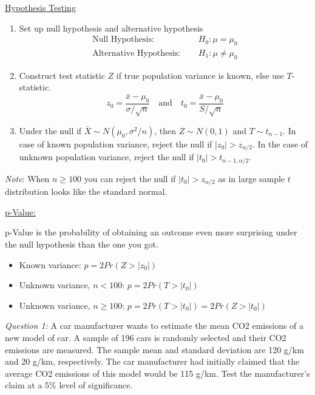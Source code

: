 \documentclass{./../../Latex/handout}
\begin{document}
\thispagestyle{plain}

\vspace{-0.5em}
\underline{Hypothesis Testing} \vspace{-0.5em}
\begin{enumerate}
  \item Set up null hypothesis and  alternative hypothesis  
 \begin{align*}
  	\text{Null Hypothesis: } \quad & H_0: \mu = \mu_0 \\
  	\text{Alternative Hypothesis: } \quad & H_1: \mu \neq \mu_0
  \end{align*}

  \item Construct test statistic $Z$ if true population variance is known, else use $T$-statistic.  
 $$ z_0 = \frac{\bar{x}-\mu_0}{\sigma/\sqrt{n}} \quad \text{and} \quad t_0 = \frac{\bar{x}-\mu_0}{S/\sqrt{n}}  $$
 \item Under the null if $\bar{X} \sim N(\mu_0, \sigma^2/n)$, then $Z \sim N(0,1)$ and $T \sim t_{n-1}$. 
In case of known population variance, reject the null if $|z_0|>z_{\alpha/2}$. In the case of unknown population variance, reject the null if $|t_0|>t_{n-1,\alpha/2}$.
\end{enumerate}
\vspace{-0.5em}
\textit{Note}: When $n \geq 100$ you can reject the null if $|t_0|>z_{\alpha/2}$ as in large sample $t$ distribution looks like the standard normal. 

\underline{p-Value:} 

p-Value is the probability of obtaining an outcome even more surprising under the null hypothesis than the one you got. \vspace{-0.5em}
\begin{itemize}
  \item Known variance: $ p = 2Pr(Z>|z_0|)$ 
\item Unknown variance, $n<100$: $p=2Pr(T>|t_0|)$ 
\item Unknown variance, $n \geq 100$:  $p=2Pr(T>|t_0|)=2Pr(Z>|t_0|)$ 
\end{itemize}

\newpage
\textit{Question 1:} A car manufacturer wants to estimate the mean CO2 emissions of a new model of car. A sample of 196 cars is randomly selected and their CO2 emissions are measured. The sample mean and standard deviation are 120 g/km and 20 g/km, respectively. The car manufacturer had initially claimed that the average CO2 emissions of this model would be 115 g/km. Test the manufacturer's claim at a 5\% level of significance.
\end{document}
